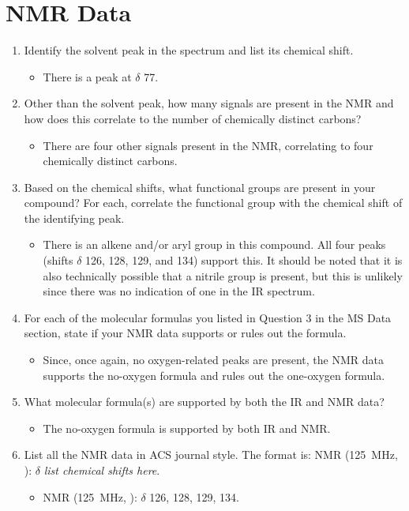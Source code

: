 \documentclass[titlepage]{article}
\begin{document}
\section*{ NMR Data}
\begin{enumerate}
    \item Identify the solvent peak in the spectrum and list its chemical shift.
    \begin{itemize}
        \item There is a  peak at $\delta$ 77.
    \end{itemize}
    \item Other than the solvent peak, how many signals are present in the  NMR and how does this correlate to the number of chemically distinct carbons?
    \begin{itemize}
        \item There are four other signals present in the  NMR, correlating to four chemically distinct carbons.
    \end{itemize}
    \item Based on the chemical shifts, what functional groups are present in your compound? For each, correlate the functional group with the chemical shift of the identifying peak.
    \begin{itemize}
        \item There is an alkene and/or aryl group in this compound. All four peaks (shifts $\delta$ 126, 128, 129, and 134) support this. It should be noted that it is also technically possible that a nitrile group is present, but this is unlikely since there was no indication of one in the IR spectrum.
    \end{itemize}
    \item For each of the molecular formulas you listed in Question 3 in the MS Data section, state if your  NMR data supports or rules out the formula.
    \begin{itemize}
        \item Since, once again, no oxygen-related peaks are present, the  NMR data supports the no-oxygen formula and rules out the one-oxygen formula.
    \end{itemize}
    \item What molecular formula(s) are supported by both the IR and  NMR data?
    \begin{itemize}
        \item The no-oxygen formula is supported by both IR and  NMR.
    \end{itemize}
    \item List all the  NMR data in ACS journal style. The format is:  NMR (\SI{125}{\mega\hertz}, ): $\delta$ \emph{list chemical shifts here}.
    \begin{itemize}
        \item {} NMR (\SI{125}{\mega\hertz}, ): $\delta$ 126, 128, 129, 134.
    \end{itemize}
\end{enumerate}
\end{document}
